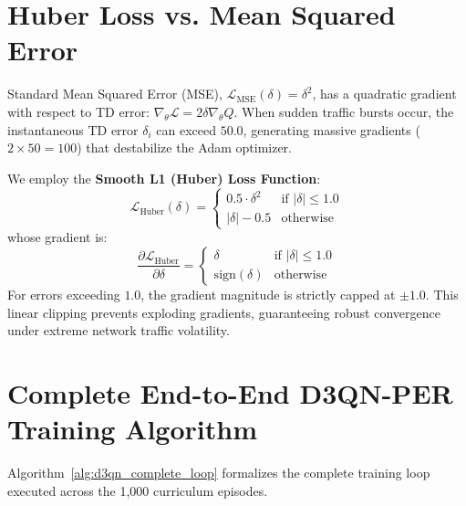 \section{Huber Loss vs. Mean Squared Error}
Standard Mean Squared Error (MSE), $\mathcal{L}_{\text{MSE}}(\delta) = \delta^2$, has a quadratic gradient with respect to TD error: $\nabla_\theta \mathcal{L} = 2 \delta \nabla_\theta Q$. When sudden traffic bursts occur, the instantaneous TD error $\delta_i$ can exceed $50.0$, generating massive gradients ($2 \times 50 = 100$) that destabilize the Adam optimizer.

We employ the \textbf{Smooth L1 (Huber) Loss Function}:
\begin{equation}
    \mathcal{L}_{\text{Huber}}(\delta) = \begin{cases}
        0.5 \cdot \delta^2 & \text{if } |\delta| \le 1.0 \\[0.5em]
        |\delta| - 0.5 & \text{otherwise}
    \end{cases}
\end{equation}
whose gradient is:
\begin{equation}
    \frac{\partial \mathcal{L}_{\text{Huber}}}{\partial \delta} = \begin{cases}
        \delta & \text{if } |\delta| \le 1.0 \\
        \text{sign}(\delta) & \text{otherwise}
    \end{cases}
\end{equation}
For errors exceeding $1.0$, the gradient magnitude is strictly capped at $\pm 1.0$. This linear clipping prevents exploding gradients, guaranteeing robust convergence under extreme network traffic volatility.

\section{Complete End-to-End D3QN-PER Training Algorithm}
Algorithm~\ref{alg:d3qn_complete_loop} formalizes the complete training loop executed across the 1,000 curriculum episodes.

